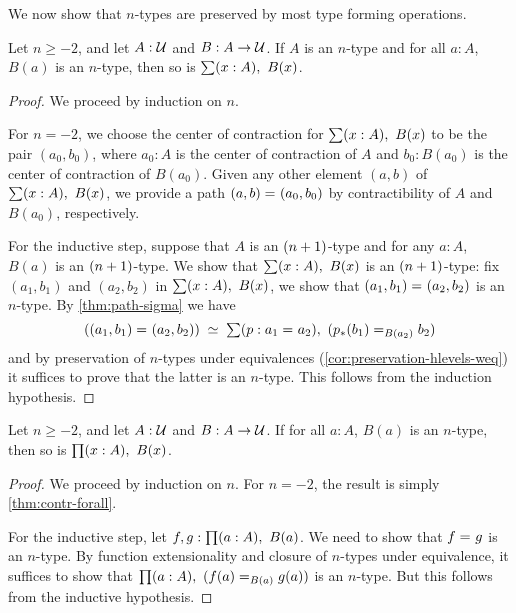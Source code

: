 We now show that $n$-types are preserved by most type forming operations.

\begin{thm}
 Let $n \geq -2$, and let $A : \mathcal{U}$ and $B : A \to \mathcal{U}$.
 If $A$ is an $n$-type and for all $a : A$, $B(a)$ is an $n$-type, then so is $\sm{x : A} B(x)$.
\end{thm}

\begin{proof}
 We proceed by induction on $n$.

 For $n = -2$, we choose the center of contraction for $\sm{x : A} B(x)$ to be the pair
       $(a_0, b_0)$, where $a_0 : A$ is the center of contraction of $A$ and $b_0 : B(a_0)$ is the center of contraction of $B(a_0)$.
       Given any other element $(a,b)$ of $\sm{x : A} B(x)$, we provide a path $(a, b) =_{} (a_0,b_0)$
       by contractibility of $A$ and $B(a_0)$, respectively.

 For the inductive step, suppose that $A$ is an $(n+1)$-type and
         for any $a : A$, $B(a)$ is an $(n+1)$-type. We show that $\sm{x : A} B(x)$ is an $(n+1)$-type:
      fix $(a_1, b_1)$ and $(a_2,b_2)$ in $\sm{x : A} B(x)$,
     we show that $(a_1, b_1) =_{} (a_2,b_2)$ is an $n$-type.
      By \autoref{thm:path-sigma} we have
      \[ \eqvspaced{(\id{(a_1, b_1)}{(a_2,b_2)})}{\sm{p : \id{a_1}{a_2}} (\id[B(a_2)]{\trans{p}{b_1}}{b_2})} \]
   and by preservation of $n$-types under equivalences (\autoref{cor:preservation-hlevels-weq})
   it suffices to prove that the latter is an $n$-type. This follows from the
   induction hypothesis.
\end{proof}


\begin{thm}\label{thm:hlevel-prod}
 Let $n\geq -2$, and let $A : \mathcal{U}$ and $B : A \to \mathcal{U}$.
 If for all $a : A$, $B(a)$ is an $n$-type, then so is $\prd{x : A} B(x)$.
\end{thm}

\begin{proof}
  We proceed by induction on $n$.
  For $n = -2$, the result is simply \autoref{thm:contr-forall}.

  For the inductive step, let $f, g : \prd{a:A}B(a)$.
  We need to show that $f =_{} g$ is an $n$-type.
  By function extensionality and closure of $n$-types under equivalence, it suffices to show that $\prd{a : A} (\id[B(a)]{f(a)}{g(a)})$ is an $n$-type.
  But this follows from the inductive hypothesis.
\end{proof}

